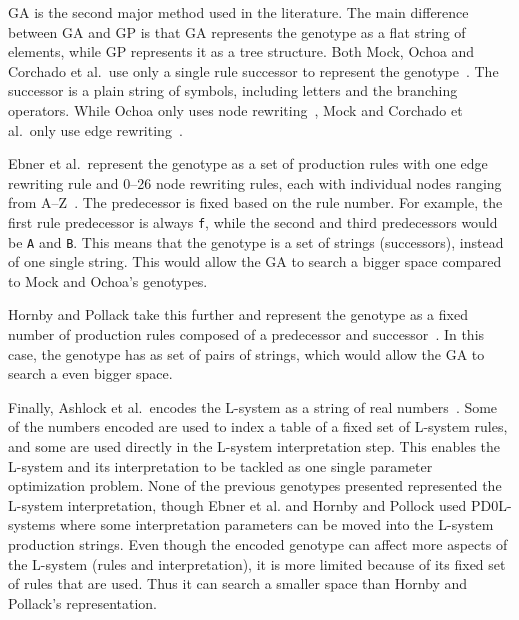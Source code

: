 \gls{GA} is the second major method used in the literature.
The main difference between \gls{GA} and \gls{GP} is that \gls{GA} represents the genotype as a flat string of elements, while \gls{GP} represents it as a tree structure.
Both Mock, Ochoa and Corchado et al.\ use only a single rule successor to represent the genotype~\cite{1998Mock,1998Ochoa,2009Corchado}.
The successor is a plain string of symbols, including letters and the branching operators.
While Ochoa only uses node rewriting~\cite{1998Ochoa}, Mock and Corchado et al.\ only use edge rewriting~\cite{1998Mock, 2009Corchado}.

Ebner et al.\ represent the genotype as a set of production rules with one edge rewriting rule and 0--26 node rewriting rules, each with individual nodes ranging from A--Z~\cite{2002Ebner,2003Ebner}.
The predecessor is fixed based on the rule number.
For example, the first rule predecessor is always \texttt{f}, while the second and third predecessors would be \texttt{A} and \texttt{B}.
This means that the genotype is a set of strings (successors), instead of one single string.
This would allow the \gls{GA} to search a bigger space compared to Mock and Ochoa's genotypes.

Hornby and Pollack take this further and represent the genotype as a fixed number of production rules composed of a predecessor and successor~\cite{2001Hornby}.
In this case, the genotype has as set of pairs of strings, which would allow the \gls{GA} to search a even bigger space.

Finally, Ashlock et al.\ encodes the \gls{L-system} as a string of real numbers~\cite{2006Ashlock}.
Some of the numbers encoded are used to index a table of a fixed set of \gls{L-system} rules, and some are used directly in the \gls{L-system} interpretation step.
This enables the \gls{L-system} and its interpretation to be tackled as one single parameter optimization problem.
None of the previous genotypes presented represented the \gls{L-system} interpretation, though Ebner et al. and Hornby and Pollock used PD0L-systems where some interpretation parameters can be moved into the \gls{L-system} production strings.
Even though the encoded genotype can affect more aspects of the \gls{L-system} (rules and interpretation), it is more limited because of its fixed set of rules that are used.
Thus it can search a smaller space than Hornby and Pollack's representation.

